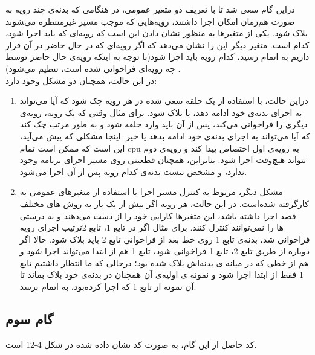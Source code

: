 دراین گام سعی شد تا با تعریف دو متغیر عمومی، در هنگامی که بدنه‌ی چند رویه به صورت هم‌زمان امکان اجرا داشتند، رویه‌هایی که موجب مسیر غیرمنتظره می‌‍شوند بلاک شود. یکی از متغیرها به منظور نشان دادن این است که رویه‌ای که باید اجرا شود، کدام است. متغیر دیگر این را نشان می‌دهد که اگر رویه‌ای که در حال حاضر در آن قرار داریم به اتمام رسید، کدام رویه باید اجرا شود(با توجه به اینکه رویه‌ی حال حاضر توسط چه رویه‌ای فراخوانی شده است، تنظیم می‌شود) .
\\
در این حالت، همچنان دو مشکل وجود دارد:
\begin{enumerate}
	\item دراین حالت، با استفاده از یک حلقه‌ سعی شده در هر رویه چک شود که آیا می‌تواند به اجرای بدنه‌ی خود ادامه دهد، یا بلاک شود. برای مثال وقتی که یک رویه، رویه‌ی دیگری را فراخوانی می‌کند، پس از آن باید وارد حلقه شود و به طور مرتب چک کند که آیا می‌تواند به اجرای بدنه‌ی خود ادامه بدهد یا خیر. اینجا مشکلی که پیش می‌آید، این است که ممکن است تمام cpu به رویه‌ی اول اختصاص پیدا کند و رویه‌ی دوم نتواند هیچ‌وقت اجرا شود. بنابراین، همچنان قطعیتی روی مسیر اجرای برنامه وجود ندارد، و مشخص نیست بدنه‌ی کدام رویه پس از آن اجرا می‌شود.
	\item مشکل دیگر، مربوط به کنترل مسیر اجرا با استفاده از متغیرهای عمومی به کارگرفته شده‌است. در این حالت، هر رویه اگر بیش از یک بار به روش های مختلف قصد اجرا داشته باشد، این متغیرها کارایی خود را از دست می‌دهند و به درستی ترتیب اجرای رویه‎‌ها را نمی‌توانند کنترل کنند. برای مثال اگر در تابع 1، تابع 2 فراحوانی شد، بدنه‌ی تابع 1 روی خط بعد از فراخوانی تابع 2 باید بلاک شود. حالا اگر دوباره از طریق تابع 2، تابع 1 فراخوانی شود، تابع 1 هم از ابتدا می‌تواند اجرا شود و هم از خطی که در میانه‌ ی بدنه‌اش بلاک شده بود؛ درحالی که ما انتظار داشتیم تابع 1 فقط از ابتدا اجرا شود و نمونه ی اولیه‌ی آن همچنان در بدنه‌ی خود بلاک بماند تا آن نمونه از تابع 1 که اجرا کرده‌بود، به اتمام برسد.
\end{enumerate}

\subsection{گام سوم}
کد حاصل از این گام، به صورت کد نشان داده شده در شکل 4-12 است.

